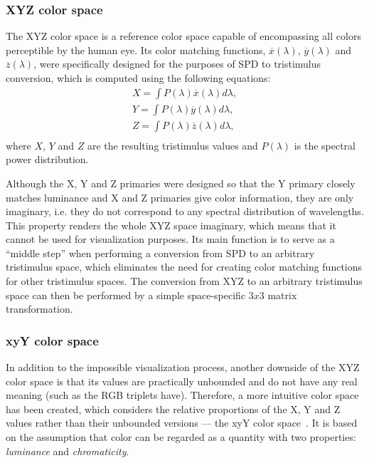 \subsubsection{XYZ color space}

The XYZ color space is a reference color space capable of encompassing all colors perceptible by the human eye. Its color matching functions, $\overline{x}(\lambda)$, $\overline{y}(\lambda)$ and $\overline{z}(\lambda)$, were specifically designed for the purposes of SPD to tristimulus conversion, which is computed using the following equations:
\begin{equation} \label{spdToXYZ}
	\begin{aligned}
	X=\int P(\lambda)\overline{x}(\lambda)d\lambda,\\
	Y=\int P(\lambda)\overline{y}(\lambda)d\lambda,\\
	Z=\int P(\lambda)\overline{z}(\lambda)d\lambda,\\
	\end{aligned}
\end{equation}
where $X$, $Y$ and $Z$ are the resulting tristimulus values and $P(\lambda)$ is the spectral power distribution.

Although the X, Y and Z primaries were designed so that the Y primary closely matches luminance and X and Z primaries give color information, they are only imaginary, i.e. they do not correspond to any spectral distribution of wavelengths. This property renders the whole XYZ space imaginary, which means that it cannot be used for visualization purposes. Its main function is to serve as a ``middle step'' when performing a conversion from SPD to an arbitrary tristimulus space, which eliminates the need for creating color matching functions for other tristimulus spaces. The conversion from XYZ to an arbitrary tristimulus space can then be performed by a simple space-specific $3x3$ matrix transformation.

\subsubsection{xyY color space} \label{sssect:xyYcolorSpace}

In addition to the impossible visualization process, another downside of the XYZ color space is that its values are practically unbounded and do not have any real meaning (such as the RGB triplets have). Therefore, a more intuitive color space has been created, which considers the relative proportions of the X, Y and Z values rather than their unbounded versions --- the xyY color space~\cite{xyYOverview}. It is based on the assumption that color can be regarded as a quantity with two properties: \emph{luminance} and \emph{chromaticity}.

